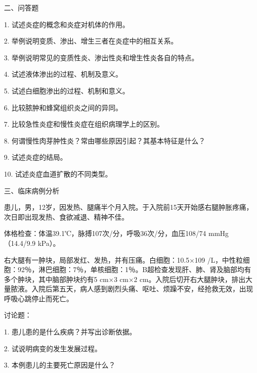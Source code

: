 {二、问答题}

1. 试述炎症的概念和炎症对机体的作用。

2. 举例说明变质、渗出、增生三者在炎症中的相互关系。

3. 举例说明常见的变质性炎、渗出性炎和增生性炎各自的特点。

4. 试述液体渗出的过程、机制及意义。

5. 试述白细胞渗出的过程、机制和意义。

6. 比较脓肿和蜂窝组织炎之间的异同。

7. 比较急性炎症和慢性炎症在组织病理学上的区别。

8. 何谓慢性肉芽肿性炎？常由哪些原因引起？其基本特征是什么？

9. 试述炎症的结局。

10. 试述炎症血道扩散的不同类型。

{三、临床病例分析}

患儿，男，12岁，因发热、腿痛半个月入院。于入院前15天开始感右腿肿胀疼痛，次日即出现发热、食欲减退、精神不佳。

体格检查：体温39.1℃，脉搏107次/分，呼吸36次/分，血压108/74
mmHg（14.4/9.9 kPa）。

右大腿有一肿块，局部发红、发热，并有压痛。白细胞：10.5×10{9}
/L，中性粒细胞：92％，淋巴细胞：7％，单核细胞：1％。B超检查发现肝、肺、肾及脑部均有多个肿块，其中脑部肿块约有5
cm×3 cm×2
cm。入院后切开右大腿肿块，排出大量脓液。入院后第五天，病人感到剧烈头痛、呕吐、烦躁不安，经抢救无效，出现呼吸心跳停止而死亡。

讨论题：

1. 患儿患的是什么疾病？并写出诊断依据。

2. 试说明病变的发生发展过程。

3. 本例患儿的主要死亡原因是什么？




